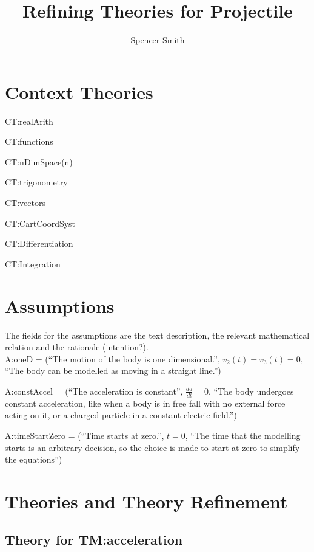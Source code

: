 \documentclass{article}
\title{Refining Theories for Projectile}
\author{Spencer Smith}
\begin{document}
\maketitle

\section{Context Theories}

\noindent CT:realArith

\noindent CT:functions

\noindent CT:nDimSpace(n)

\noindent CT:trigonometry

\noindent CT:vectors

\noindent CT:CartCoordSyst

\noindent CT:Differentiation

\noindent CT:Integration

\section{Assumptions}

The fields for the assumptions are the text description, the relevant
mathematical relation and the rationale (intention?).\\

\noindent A:oneD = (``The motion of the body is one dimensional.'', $v_2(t) =
v_3(t) = 0$, ``The body can be modelled as moving in a straight line.'')

\noindent A:constAccel = (``The acceleration is constant'', $\frac{d a}{dt} =
0$, ``The body undergoes constant acceleration, like when a body is in free fall
with no external force acting on it, or a charged particle in a constant
electric field.'')

\noindent A:timeStartZero = (``Time starts at zero.'', $t = 0$, ``The time that
the modelling starts is an arbitrary decision, so the choice is made to start at
zero to simplify the equations'')

\section{Theories and Theory Refinement}

\subsection{Theory for TM:acceleration}
\end{document}
